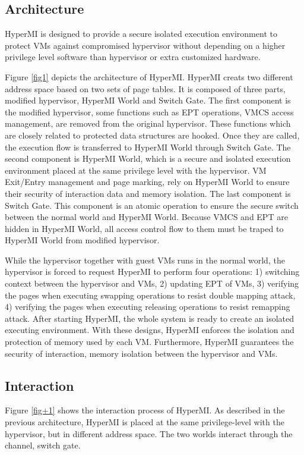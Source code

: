 \documentclass[conference]{IEEEtran}
\begin{document}
\subsection{Architecture} 
HyperMI is designed to provide a secure isolated execution environment to protect VMs against compromised hypervisor without depending on a higher privilege level software than hypervisor or extra customized hardware.

Figure \ref{fig1} depicts the architecture of HyperMI. HyperMI creats two different address space based on two sets of page tables. It is composed of three parts, modified hypervisor, HyperMI World and Switch Gate. The first component is the modified hypervisor, some functions such as EPT operations, VMCS access management, are removed from the original hypervisor. These functions which are closely related to protected data structures are hooked. Once they are called, the execution flow is transferred to HyperMI World through Switch Gate. The second component is HyperMI World, which is a secure and isolated execution environment placed at the same privilege level with the hypervisor. VM Exit/Entry management and page marking, rely on HyperMI World to ensure their security of interaction data and memory isolation. The last component is Switch Gate. This component is an atomic operation to ensure the secure switch between the normal world and HyperMI World. Because VMCS and EPT are hidden in HyperMI World, all access control flow to them must be traped to HyperMI World from modified hypervisor.

While the hypervisor together with guest VMs runs in the normal world, the hypervisor is forced to request HyperMI to perform four operations: 1) switching context between the hypervisor and VMs, 2) updating EPT of VMs, 3) verifying the pages when executing swapping operations to resist double mapping attack, 4) verifying the pages when executing releasing operations to resist remapping attack. After starting HyperMI, the whole system is ready to create an isolated executing environment. With these designs, HyperMI enforces the isolation and protection of memory used by each VM. Furthermore, HyperMI guarantees the security of interaction, memory isolation between the hypervisor and VMs.


\iffalse
\subsection{Interaction} \label{IN}


Figure \ref{fig+1} shows the interaction process of HyperMI. 
As described in the previous architecture, HyperMI is placed at the same privilege-level with the hypervisor, but in different address space. The two worlds interact through the channel, switch gate.
\end{document}
